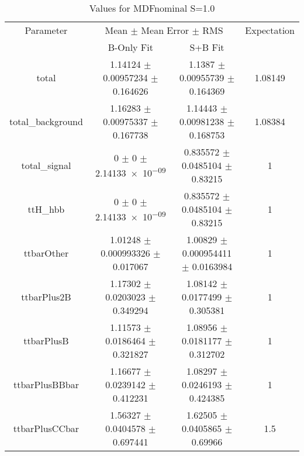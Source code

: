 \begin{table}
\centering
\caption{Values for MDFnominal S=1.0}
\begin{tabular}{cccc}
\toprule
Parameter & \multicolumn{2}{c}{Mean $\pm$ Mean Error $\pm$ RMS} & Expectation\\
 & B-Only Fit & S+B Fit & \\
\midrule
total & \num{1.14124} $\pm$ \num{0.00957234} $\pm$ \num{0.164626} & \num{1.1387} $\pm$ \num{0.00955739} $\pm$ \num{0.164369} & \num{1.08149}\\
total\_background & \num{1.16283} $\pm$ \num{0.00975337} $\pm$ \num{0.167738} & \num{1.14443} $\pm$ \num{0.00981238} $\pm$ \num{0.168753} & \num{1.08384}\\
total\_signal & \num{0} $\pm$ \num{0} $\pm$ \num{2.14133e-09} & \num{0.835572} $\pm$ \num{0.0485104} $\pm$ \num{0.83215} & \num{1}\\
ttH\_hbb & \num{0} $\pm$ \num{0} $\pm$ \num{2.14133e-09} & \num{0.835572} $\pm$ \num{0.0485104} $\pm$ \num{0.83215} & \num{1}\\
ttbarOther & \num{1.01248} $\pm$ \num{0.000993326} $\pm$ \num{0.017067} & \num{1.00829} $\pm$ \num{0.000954411} $\pm$ \num{0.0163984} & \num{1}\\
ttbarPlus2B & \num{1.17302} $\pm$ \num{0.0203023} $\pm$ \num{0.349294} & \num{1.08142} $\pm$ \num{0.0177499} $\pm$ \num{0.305381} & \num{1}\\
ttbarPlusB & \num{1.11573} $\pm$ \num{0.0186464} $\pm$ \num{0.321827} & \num{1.08956} $\pm$ \num{0.0181177} $\pm$ \num{0.312702} & \num{1}\\
ttbarPlusBBbar & \num{1.16677} $\pm$ \num{0.0239142} $\pm$ \num{0.412231} & \num{1.08297} $\pm$ \num{0.0246193} $\pm$ \num{0.424385} & \num{1}\\
ttbarPlusCCbar & \num{1.56327} $\pm$ \num{0.0404578} $\pm$ \num{0.697441} & \num{1.62505} $\pm$ \num{0.0405865} $\pm$ \num{0.69966} & \num{1.5}\\
\bottomrule
\end{tabular}
\end{table}